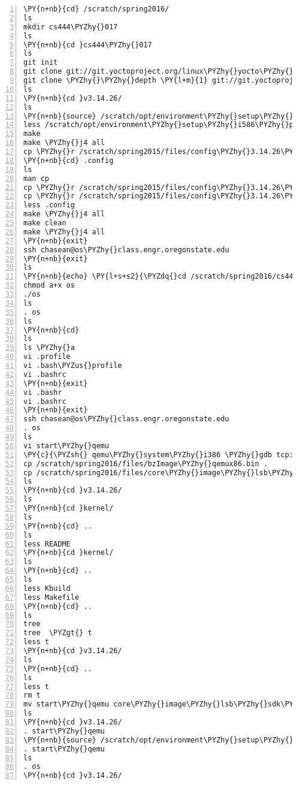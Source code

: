 \begin{Verbatim}[commandchars=\\\{\},numbers=left,firstnumber=1,stepnumber=1]
\PY{n+nb}{cd} /scratch/spring2016/
ls
mkdir cs444\PYZhy{}017
ls
\PY{n+nb}{cd }cs444\PYZhy{}017
ls
git init
git clone git://git.yoctoproject.org/linux\PYZhy{}yocto\PYZhy{}3.14
git clone \PYZhy{}\PYZhy{}depth \PY{l+m}{1} git://git.yoctoproject.org/linux\PYZhy{}yocto\PYZhy{}3.14 v3.14.26
ls
\PY{n+nb}{cd }v3.14.26/
ls
\PY{n+nb}{source} /scratch/opt/environment\PYZhy{}setup\PYZhy{}i586\PYZhy{}poky\PYZhy{}linux
less /scratch/opt/environment\PYZhy{}setup\PYZhy{}i586\PYZhy{}poky\PYZhy{}linux
make
make \PYZhy{}j4 all
cp \PYZhy{}r /scratch/spring2015/files/config\PYZhy{}3.14.26\PYZhy{}yocto\PYZhy{}qemu .config
\PY{n+nb}{cd} .config
ls
man cp
cp \PYZhy{}r /scratch/spring2015/files/config\PYZhy{}3.14.26\PYZhy{}yocto\PYZhy{}qemu .config/
cp \PYZhy{}r /scratch/spring2015/files/config\PYZhy{}3.14.26\PYZhy{}yocto\PYZhy{}qemu .config
less .config
make \PYZhy{}j4 all
make clean
make \PYZhy{}j4 all
\PY{n+nb}{exit}
ssh chasean@os\PYZhy{}class.engr.oregonstate.edu
\PY{n+nb}{exit}
ls
\PY{n+nb}{echo} \PY{l+s+s2}{\PYZdq{}cd /scratch/spring2016/cs444\PYZhy{}017\PYZdq{}} \PYZgt{} os
chmod a+x os
./os
ls
. os
ls
\PY{n+nb}{cd}
ls
ls \PYZhy{}a
vi .profile
vi .bash\PYZus{}profile 
vi .bashrc
\PY{n+nb}{exit}
vi .bashr
vi .bashrc
\PY{n+nb}{exit}
ssh chasean@os\PYZhy{}class.engr.oregonstate.edu
. os
ls
vi start\PYZhy{}qemu
\PY{c}{\PYZsh{} qemu\PYZhy{}system\PYZhy{}i386 \PYZhy{}gdb tcp::5517 \PYZhy{}S \PYZhy{}nographic \PYZhy{}kernel arch/x86/boot/bzImage \PYZhy{}drive file=core\PYZhy{}image\PYZhy{}lsb\PYZhy{}sdk\PYZhy{}qemux86.ext3,if=virtio \PYZhy{}enable\PYZhy{}kvm \PYZhy{}net none \PYZhy{}usb \PYZhy{}localtime \PYZhy{}\PYZhy{}no\PYZhy{}reboot \PYZhy{}\PYZhy{}append \PYZdq{}root=/dev/vda rw console=ttyS0 debug\PYZdq{}}
cp /scratch/spring2016/files/bzImage\PYZhy{}qemux86.bin .
cp /scratch/spring2016/files/core\PYZhy{}image\PYZhy{}lsb\PYZhy{}sdk\PYZhy{}qemux86.ext3 .
ls
\PY{n+nb}{cd }v3.14.26/
ls
\PY{n+nb}{cd }kernel/
ls
\PY{n+nb}{cd} ..
ls
less README 
\PY{n+nb}{cd }kernel/
ls
\PY{n+nb}{cd} ..
ls
less Kbuild 
less Makefile 
\PY{n+nb}{cd} ..
ls
tree 
tree  \PYZgt{} t
less t
\PY{n+nb}{cd }v3.14.26/
ls
\PY{n+nb}{cd} ..
ls
less t
rm t
mv start\PYZhy{}qemu core\PYZhy{}image\PYZhy{}lsb\PYZhy{}sdk\PYZhy{}qemux86.ext3 bzImage\PYZhy{}qemux86.bin v3.14.26/
ls
\PY{n+nb}{cd }v3.14.26/
. start\PYZhy{}qemu 
\PY{n+nb}{source} /scratch/opt/environment\PYZhy{}setup\PYZhy{}i586\PYZhy{}poky\PYZhy{}linux
. start\PYZhy{}qemu
ls
. os
\PY{n+nb}{cd }v3.14.26/

\end{Verbatim}
